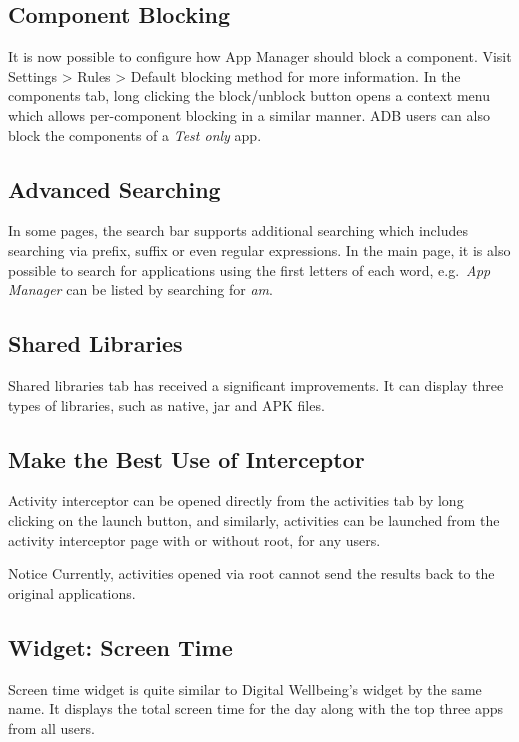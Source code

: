 \subsection{Component Blocking}
It is now possible to configure how App Manager should block a component. Visit Settings > Rules > Default blocking method for more information.
In the components tab, long clicking the block/unblock button opens a context menu which allows per-component blocking in a similar manner.
ADB users can also block the components of a \textit{Test only} app.

\subsection{Advanced Searching}
In some pages, the search bar supports additional searching which includes searching via prefix, suffix or even regular expressions.
In the main page, it is also possible to search for applications using the first letters of each word, e.g.\ \textit{App Manager} can be listed by searching for \textit{am}.

\subsection{Shared Libraries}
Shared libraries tab has received a significant improvements. It can display three types of libraries, such as native, jar and APK files.

\subsection{Make the Best Use of Interceptor}
Activity interceptor can be opened directly from the activities tab by long clicking on the launch button, and similarly, activities can be launched from the activity interceptor page with or without root, for any users.

\begin{tip}{Notice}
    Currently, activities opened via root cannot send the results back to the original applications.
\end{tip}

\subsection{Widget: Screen Time}
Screen time widget is quite similar to Digital Wellbeing's widget by the same name.
It displays the total screen time for the day along with the top three apps from all users.

